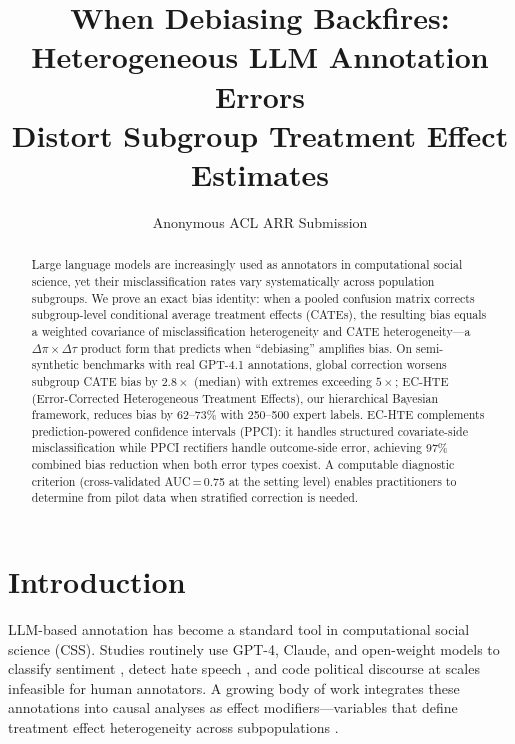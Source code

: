 \documentclass[11pt,twocolumn]{article}
\title{When Debiasing Backfires: Heterogeneous LLM Annotation Errors\\Distort Subgroup Treatment Effect Estimates}
\author{Anonymous ACL ARR Submission}
\date{}
\theoremstyle{remark}
\begin{document}
\maketitle

\begin{abstract}
Large language models are increasingly used as annotators in computational social science, yet their misclassification rates vary systematically across population subgroups. We prove an exact bias identity: when a pooled confusion matrix corrects subgroup-level conditional average treatment effects (CATEs), the resulting bias equals a weighted covariance of misclassification heterogeneity and CATE heterogeneity---a $\Delta\pi \times \Delta\tau$ product form that predicts when ``debiasing'' amplifies bias.
On semi-synthetic benchmarks with real GPT-4.1 annotations, global correction worsens subgroup CATE bias by $2.8\times$ (median) with extremes exceeding $5\times$; EC-HTE (Error-Corrected Heterogeneous Treatment Effects), our hierarchical Bayesian framework, reduces bias by 62--73\% with 250--500 expert labels.
EC-HTE complements prediction-powered confidence intervals (PPCI): it handles structured covariate-side misclassification while PPCI rectifiers handle outcome-side error, achieving 97\% combined bias reduction when both error types coexist.
A computable diagnostic criterion (cross-validated AUC\,=\,0.75 at the setting level) enables practitioners to determine from pilot data when stratified correction is needed.
\end{abstract}

\section{Introduction}

LLM-based annotation has become a standard tool in computational social science (CSS).
Studies routinely use GPT-4, Claude, and open-weight models to classify sentiment \cite{gilardi2023chatgpt}, detect hate speech \cite{tornberg2024chatgpt}, and code political discourse \cite{ziems2024can} at scales infeasible for human annotators.
A growing body of work integrates these annotations into causal analyses as effect modifiers---variables that define treatment effect heterogeneity across subpopulations \cite{ashwin2025using}.
\end{document}
